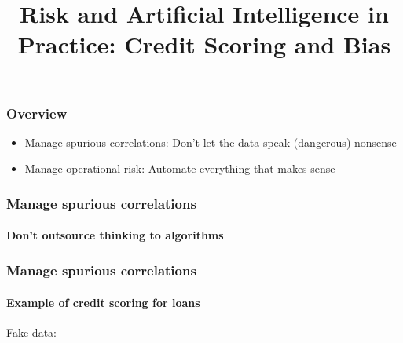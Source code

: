 

\title{Risk and Artificial Intelligence in Practice: Credit Scoring and Bias}

\maketitle

\begin{frame}
    \frametitle{Overview}
    \begin{itemize}
        \item Manage spurious correlations: Don't let the data speak (dangerous) nonsense
        \item Manage operational risk: Automate everything that makes sense
    \end{itemize}
\end{frame}

\begin{frame}
\frametitle{Manage spurious correlations}
\framesubtitle{Don't outsource thinking to algorithms}
    \begin{center}
    \end{center}
\end{frame}

\begin{frame}
    \frametitle{Manage spurious correlations}
    \framesubtitle{Example of credit scoring for loans}

    Fake data:\newline\newline
    \newline
    \end{frame}


